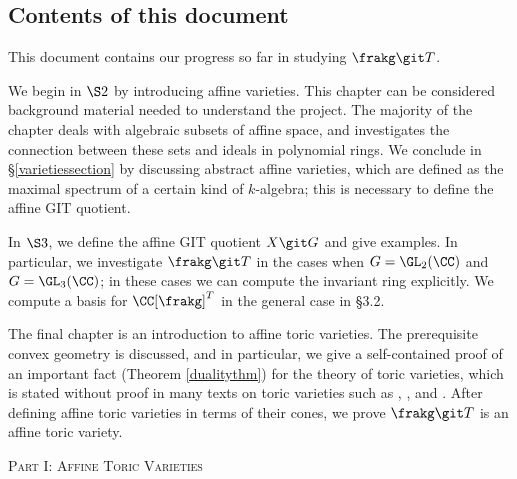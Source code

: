 \documentclass[12pt]{amsart}
\theoremstyle{plain}
\begin{document}
\subsection{Contents of this document}
This document contains our progress so far in studying $\frakg \git T$.

We begin in $\S 2$ by introducing affine varieties.
This chapter can be considered background material needed to understand the project.
The majority of the chapter deals with algebraic subsets of affine space, and investigates the connection between these sets and ideals in polynomial rings.
We conclude in \S \ref{varietiessection} by discussing abstract affine varieties, which are defined as the maximal spectrum of a certain kind of $k$-algebra;
this is necessary to define the affine GIT quotient.

In $\S 3$, we define the affine GIT quotient $X \git G$ and give examples.
In particular, we investigate $\frakg \git T$ in the cases when $G = \GL_2(\CC)$ and $G = \GL_3(\CC)$; in these cases we can compute the invariant ring explicitly.
We compute a basis for $\CC[\frakg]^T$ in the general case in \S 3.2.

The final chapter is an introduction to affine toric varieties.
The prerequisite convex geometry is discussed, and in particular, we give a self-contained proof of an important fact (Theorem \ref{dualitythm}) for the theory of toric varieties, which is stated without proof in many texts on toric varieties such as \cite{Fulton93}, \cite{CLS11}, and \cite{Oda88}.
After defining affine toric varieties in terms of their cones, we prove $\frakg \git T$ is an affine toric variety.


\newpage
{}
{}
\thispagestyle{empty} %
\vspace*{\fill} %
\begin{center}
    \Huge \textsc{Part I: Affine Toric Varieties}
\end{center}
\vspace*{\fill}
\end{document}
